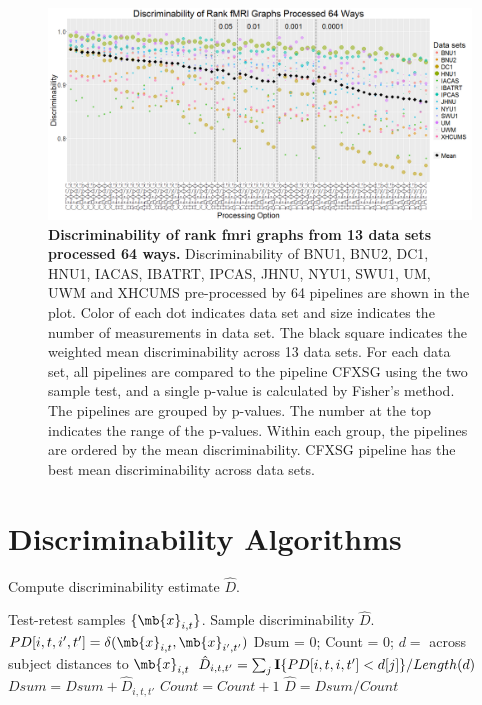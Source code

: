 \documentclass[simplex.tex]{subfiles}
\newcommand{\bx}{\mb{x}}
\begin{document}
\begin{figure}[h!]
	\begin{cframed}
		\centering
		\includegraphics[width=\textwidth]{../../figs/fmri_rank_pv_v2.png}
		\caption{
			{\bf Discriminability of rank fmri graphs from 13 data sets processed 64 ways.}  Discriminability of BNU1, BNU2, DC1, HNU1, IACAS, IBATRT, IPCAS, JHNU, NYU1, SWU1, UM, UWM and XHCUMS pre-processed by 64 pipelines are shown in the plot. Color of each dot indicates data set and size indicates the number of measurements in data set. The black square indicates the weighted mean discriminability across 13 data sets.  For each data set, all pipelines are compared to the pipeline CFXSG using the two sample test, and a single p-value is calculated by Fisher's method. The pipelines are grouped by p-values. The number at the top indicates the range of the p-values. Within each group, the pipelines are ordered by the mean discriminability. CFXSG pipeline has the best mean discriminability across data sets.}
		\label{fig:pipes}
	\end{cframed}
\end{figure}

\section*{Discriminability Algorithms}
\begin{algorithm}               
	\caption{Compute discriminability estimate $\hat{D}$.  }   
	\label{alg:dhat}                       
	\begin{algorithmic}                    
		\Require Test-retest samples $\{\bx_{i,t}\}$.
		\Ensure Sample discriminability $\hat{D}$. 
		 
		\State $PD[i,t,i',t'] = \delta(\bx_{i,t},\bx_{i',t'})$
		\EndFor
		\State Dsum = 0;
		\State Count = 0;
		\State $d =$ across subject distances to $\bx_{i,t}$
		\State $\hat{D}_{i,t,t'} =\sum_j {\bf I}\{PD[i,t,i,t'] < d[j]\}/Length(d)$ 
		\State $Dsum = Dsum + \hat{D}_{i,t,t'}$
		\State $Count = Count + 1$
		\EndFor	
		\EndFor
		\EndFor
		\State $\hat{D} = Dsum / Count$ 
		\EndFunction
	\end{algorithmic}
\end{algorithm}
\end{document}
